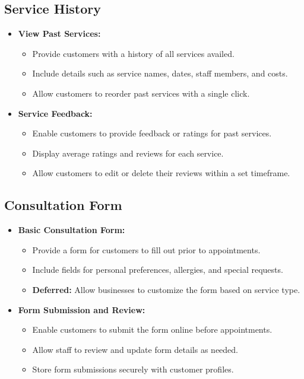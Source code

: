 \subsection{Service History}
\begin{itemize}[leftmargin=*]
    \item \textbf{View Past Services:}
    \begin{itemize}
        \item Provide customers with a history of all services availed.
        \item Include details such as service names, dates, staff members, and costs.
        \item Allow customers to reorder past services with a single click.
    \end{itemize}
    
    \item \textbf{Service Feedback:}
    \begin{itemize}
        \item Enable customers to provide feedback or ratings for past services.
        \item Display average ratings and reviews for each service.
        \item Allow customers to edit or delete their reviews within a set timeframe.
    \end{itemize}
\end{itemize}

\subsection{Consultation Form}
\begin{itemize}[leftmargin=*]
    \item \textbf{Basic Consultation Form:}
    \begin{itemize}
        \item Provide a form for customers to fill out prior to appointments.
        \item Include fields for personal preferences, allergies, and special requests.
        \item \textbf{Deferred:} Allow businesses to customize the form based on service type.
    \end{itemize}
    
    \item \textbf{Form Submission and Review:}
    \begin{itemize}
        \item Enable customers to submit the form online before appointments.
        \item Allow staff to review and update form details as needed.
        \item Store form submissions securely with customer profiles.
    \end{itemize}
\end{itemize}


